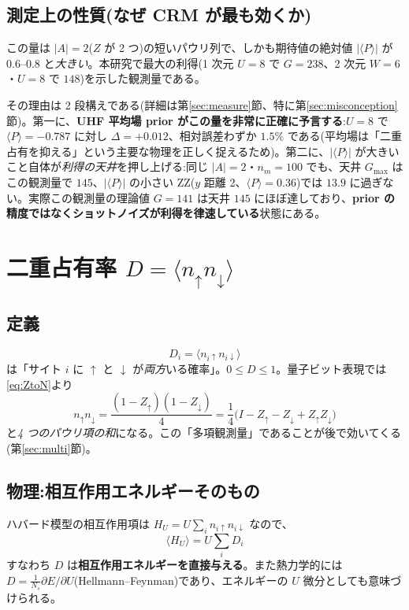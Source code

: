 \documentclass[11pt,a4paper]{ltjsarticle}
\newcommand{\ev}[1]{\langle #1\rangle}
\newcommand{\up}{\uparrow}
\newcommand{\dn}{\downarrow}
\begin{document}
\subsection{測定上の性質(なぜ CRM が最も効くか)}
この量は $|A|=2$($Z$ が 2 つ)の短いパウリ列で、しかも期待値の絶対値 $|\ev{P}|$ が $0.6$--$0.8$ と\emph{大きい}。本研究で最大の利得(1 次元 $U=8$ で $G=238$、2 次元 $W=6$・$U=8$ で $148$)を示した観測量である。

その理由は 2 段構えである(詳細は第\ref{sec:measure}節、特に第\ref{sec:misconception}節)。第一に、\textbf{UHF 平均場 prior がこの量を非常に正確に予言する}:$U=8$ で $\ev{P}=-0.787$ に対し $\Delta=+0.012$、相対誤差わずか $1.5\%$ である(平均場は「二重占有を抑える」という主要な物理を正しく捉えるため)。第二に、$|\ev{P}|$ が大きいこと自体が\emph{利得の天井}を押し上げる:同じ $|A|=2$・$n_m=100$ でも、天井 $G_{\max}$ はこの観測量で $145$、$|\ev{P}|$ の小さい ZZ($y$ 距離 2、$\ev{P}=0.36$)では $13.9$ に過ぎない。実際この観測量の理論値 $G=141$ は天井 $145$ にほぼ達しており、\textbf{prior の精度ではなくショットノイズが利得を律速している}状態にある。

\section{二重占有率 $D=\ev{n_\up n_\dn}$}
\label{sec:docc}

\subsection{定義}
\begin{equation}
  D_i = \ev{n_{i\up}n_{i\dn}}
\end{equation}
は「サイト $i$ に $\up$ と $\dn$ が\emph{両方}いる確率」。$0\le D\le1$。量子ビット表現では\eqref{eq:ZtoN}より
\begin{equation}
  n_\up n_\dn = \frac{(1-Z_\up)(1-Z_\dn)}{4} = \frac14\bigl(I - Z_\up - Z_\dn + Z_\up Z_\dn\bigr)
  \label{eq:docc-pauli}
\end{equation}
と\emph{4 つのパウリ項の和}になる。この「多項観測量」であることが後で効いてくる(第\ref{sec:multi}節)。

\subsection{物理:相互作用エネルギーそのもの}
ハバード模型の相互作用項は $H_U = U\sum_i n_{i\up}n_{i\dn}$ なので、
\begin{equation}
  \ev{H_U} = U\sum_i D_i
\end{equation}
すなわち $D$ は\textbf{相互作用エネルギーを直接与える}。また熱力学的には $D=\frac{1}{N_s}\partial E/\partial U$(Hellmann--Feynman)であり、エネルギーの $U$ 微分としても意味づけられる。
\end{document}
